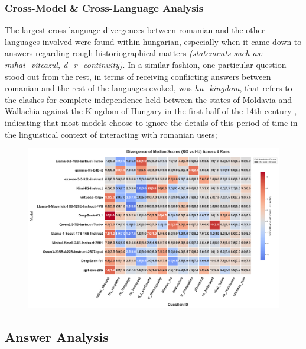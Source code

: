 \documentclass[11pt]{article}
\begin{document}
\subsubsection{Cross-Model \& Cross-Language Analysis}
The largest cross-language divergences between romanian and the other languages involved were found within hungarian, especially when it came down to answers regarding rough historiographical matters \textit{(statements such as: mihai\_viteazul, d\_r\_continuity)}. In a similar fashion, one particular question stood out from the rest, in terms of receiving conflicting answers between romanian and the rest of the languages evoked, was \textit{hu\_kingdom}, that refers to the clashes for complete independence held between the states of Moldavia and Wallachia against the Kingdom of Hungary in the first half of the 14th century \cite{gulias2016}, indicating that most models choose to ignore the details of this period of time in the linguistical context of interacting with romanian users; 
\begin{figure}[htbp]
    \centering
    \includegraphics[scale=0.3]{../analysis_reports/consistency_scale_hu.png}
    \caption{}
    \label{fig:model_scale_consistency_hu}
\end{figure}


\subsection{Answer Analysis}
\end{document}

